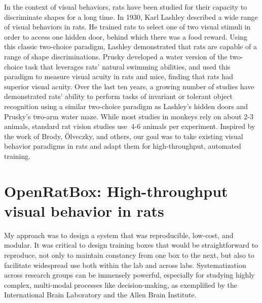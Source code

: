 In the context of visual behaviors, rats have been studied for their capacity to discriminate shapes for a long time. In 1930, Karl Lashley\cite{Lashley1930} described a wide range of visual behaviors in rats. He trained rats to select one of two visual stimuli in order to access one hidden door, behind which there was a food reward\cite{Lashley1938}. Using this classic two-choice paradigm, Lashley demonstrated that rats are capable of a range of shape discriminations. Prusky developed a water version of the two-choice task that leverages rats' natural swimming abilities, and used this paradigm to measure visual acuity in rats and mice, finding that rats had superior visual acuity\cite{Prusky2000}. Over the last ten years, a growing number of studies have demonstrated rats' ability to perform tasks of invariant or tolerant object recognition using a similar two-choice paradigm as Lashley's hidden doors and Prusky's two-arm water maze\cite{Zoccolan2009, Vermaercke2012, Tafazoli2012, Alemi-Neissi2013, Djurdjevic2018}. While most studies in monkeys rely on about 2-3 animals, standard rat vision studies use $~$4-6 animals per experiment. Inspired by the work of Brody, {\"O}lveczky, and others, our goal was to take existing visual behavior paradigms in rats and adapt them for high-throughput, automated training. 


\section{OpenRatBox: High-throughput visual behavior in rats}
My approach was to design a system that was reproducible, low-cost, and modular. It was critical to design training boxes that would be straightforward to reproduce, not only to maintain constancy from one box to the next, but also to facilitate widespread use both within the lab and across labs. Systematization across research groups can be immensely powerful, especially for studying highly complex, multi-modal processes like decision-making, as exemplified by the International Brain Laboratory and the Allen Brain Institute.

